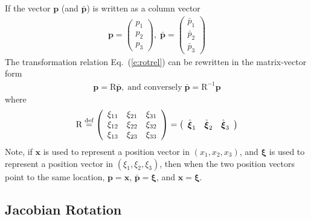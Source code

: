 \documentclass[a4paper,12pt,dvips]{article}
\newcommand*\defeq{\buildrel{\text{def}}\over{=}}
\begin{document}
If the vector $\mathbf{p}$ (and $\bar{\mathbf{p}}$) is written as a column
vector
\begin{align*}
  \mathbf{p} = \left(\begin{array}{c}
    p_1 \\ p_2 \\ p_3
  \end{array}\right), \;
  \bar{\mathbf{p}} = \left(\begin{array}{c}
    \bar{p}_1 \\ \bar{p}_2 \\ \bar{p}_3
  \end{array}\right)
\end{align*}
The transformation relation Eq.~(\ref{e:rotrel}) can be rewritten in the
matrix-vector form
\begin{align}
  \mathbf{p} = \mathrm{R}\bar{\mathbf{p}},
  \; \mbox{and conversely} \;
  \bar{\mathbf{p}} = \mathrm{R}^{-1}\mathbf{p}
  \label{e:rotmv}
\end{align}
where
\begin{align}
  \mathrm{R}
  \defeq \left(\begin{array}{ccc}
    \xi_{11} & \xi_{21} & \xi_{31} \\
    \xi_{12} & \xi_{22} & \xi_{32} \\
    \xi_{13} & \xi_{23} & \xi_{33}
  \end{array}\right)
  = \left(\begin{array}{ccc}
    \hat{\boldsymbol{\xi}}_1 &
    \hat{\boldsymbol{\xi}}_2 &
    \hat{\boldsymbol{\xi}}_3
  \end{array}\right)
  \label{e:rotmat}
\end{align}
Note, if $\mathbf{x}$ is used to represent a position vector in $(x_1, x_2,
x_3)$, and $\boldsymbol{\xi}$ is used to represent a position vector in
$(\xi_1, \xi_2, \xi_3)$, then when the two position vectors point to the same
location, $\mathbf{p} = \mathbf{x}$, $\bar{\mathbf{p}} = \boldsymbol{\xi}$, and
$\mathbf{x} = \boldsymbol{\xi}$.

\subsection{Jacobian Rotation}
\end{document}
